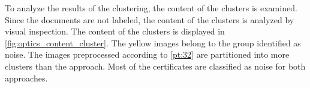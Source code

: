 To analyze the results of the clustering, the content of the clusters is examined.
Since the documents are not labeled, the content of the clusters is analyzed by visual inspection.
The content of the clusters is displayed in \autoref{fig:optics_content_cluster}.
The yellow images belong to the group identified as noise.
The images preprocessed according to \autoref{pt:32} are partitioned into more clusters than the \eigendocs{} approach.
Most of the certificates are classified as noise for both approaches.

\begin{figure}[!htb]%
    \centering
    \qquad

\end{figure}

